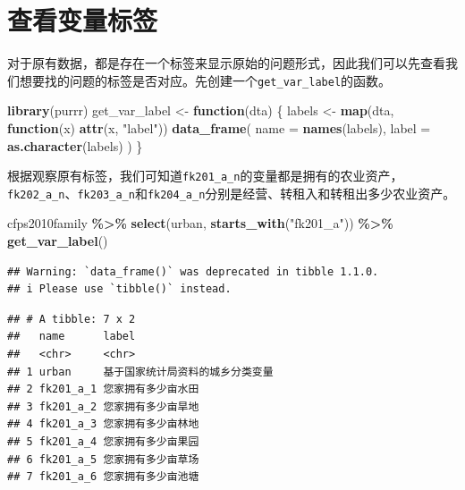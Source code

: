 \documentclass[
]{book}
\newenvironment{Shaded}{\begin{snugshade}}{\end{snugshade}}
\newcommand{\AttributeTok}[1]{\textcolor[rgb]{0.13,0.29,0.53}{#1}}
\newcommand{\ControlFlowTok}[1]{\textcolor[rgb]{0.13,0.29,0.53}{\textbf{#1}}}
\newcommand{\FunctionTok}[1]{\textcolor[rgb]{0.13,0.29,0.53}{\textbf{#1}}}
\newcommand{\NormalTok}[1]{#1}
\newcommand{\OtherTok}[1]{\textcolor[rgb]{0.56,0.35,0.01}{#1}}
\newcommand{\SpecialCharTok}[1]{\textcolor[rgb]{0.81,0.36,0.00}{\textbf{#1}}}
\newcommand{\StringTok}[1]{\textcolor[rgb]{0.31,0.60,0.02}{#1}}
\begin{document}
\hypertarget{ux67e5ux770bux53d8ux91cfux6807ux7b7e}{%
\section{查看变量标签}\label{ux67e5ux770bux53d8ux91cfux6807ux7b7e}}

对于原有数据，都是存在一个标签来显示原始的问题形式，因此我们可以先查看我们想要找的问题的标签是否对应。先创建一个\texttt{get\_var\_label}的函数。

\begin{Shaded}
\begin{Highlighting}[]
\FunctionTok{library}\NormalTok{(purrr)}
\NormalTok{get\_var\_label }\OtherTok{\textless{}{-}} \ControlFlowTok{function}\NormalTok{(dta) \{}
\NormalTok{  labels }\OtherTok{\textless{}{-}} \FunctionTok{map}\NormalTok{(dta, }\ControlFlowTok{function}\NormalTok{(x) }\FunctionTok{attr}\NormalTok{(x, }\StringTok{"label"}\NormalTok{))}
  \FunctionTok{data\_frame}\NormalTok{(}
    \AttributeTok{name =} \FunctionTok{names}\NormalTok{(labels),}
    \AttributeTok{label =} \FunctionTok{as.character}\NormalTok{(labels)}
\NormalTok{  )}
\NormalTok{\}}
\end{Highlighting}
\end{Shaded}

根据观察原有标签，我们可知道\texttt{fk201\_a\_n}的变量都是拥有的农业资产，\texttt{fk202\_a\_n}、\texttt{fk203\_a\_n}和\texttt{fk204\_a\_n}分别是经营、转租入和转租出多少农业资产。

\begin{Shaded}
\begin{Highlighting}[]
\NormalTok{cfps2010family }\SpecialCharTok{\%\textgreater{}\%}
  \FunctionTok{select}\NormalTok{(urban, }\FunctionTok{starts\_with}\NormalTok{(}\StringTok{"fk201\_a"}\NormalTok{)) }\SpecialCharTok{\%\textgreater{}\%}
  \FunctionTok{get\_var\_label}\NormalTok{()}
\end{Highlighting}
\end{Shaded}

\begin{verbatim}
## Warning: `data_frame()` was deprecated in tibble 1.1.0.
## i Please use `tibble()` instead.
\end{verbatim}

\begin{verbatim}
## # A tibble: 7 x 2
##   name      label                           
##   <chr>     <chr>                           
## 1 urban     基于国家统计局资料的城乡分类变量
## 2 fk201_a_1 您家拥有多少亩水田              
## 3 fk201_a_2 您家拥有多少亩旱地              
## 4 fk201_a_3 您家拥有多少亩林地              
## 5 fk201_a_4 您家拥有多少亩果园              
## 6 fk201_a_5 您家拥有多少亩草场              
## 7 fk201_a_6 您家拥有多少亩池塘
\end{verbatim}
\end{document}
